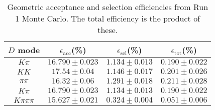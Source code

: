 \begin{table}[H]
    \centering
    \begin{tabular}{cccc}
        \toprule
        $D$ mode & $\epsilon_\mathrm{acc}$(\%) &  $\epsilon_\mathrm{sel}$(\%) &  $\epsilon_\mathrm{tot}$(\%) \\
        \midrule
        $K\pi$ & $16.790 \pm 0.023$ & $1.134 \pm 0.013$ & $0.190 \pm 0.022$ \\
        $KK$ & $17.54 \pm 0.04$ & $1.146 \pm 0.017$ & $0.201 \pm 0.026$ \\
        $\pi\pi$ & $16.32 \pm 0.06$ & $1.291 \pm 0.018$ & $0.211 \pm 0.028$ \\
        $K\pi$ & $16.790 \pm 0.023$ & $1.134 \pm 0.013$ & $0.190 \pm 0.022$ \\
        $K\pi\pi\pi$ & $15.627 \pm 0.021$ & $0.324 \pm 0.004$ & $0.051 \pm 0.006$ \\
        \bottomrule
    \end{tabular}
    \caption{Geometric acceptance and selection efficiencies from  Run 1 Monte Carlo. The total efficiency is the  product of these.}
\label{tab:selection_efficiency_run1}
\end{table}
